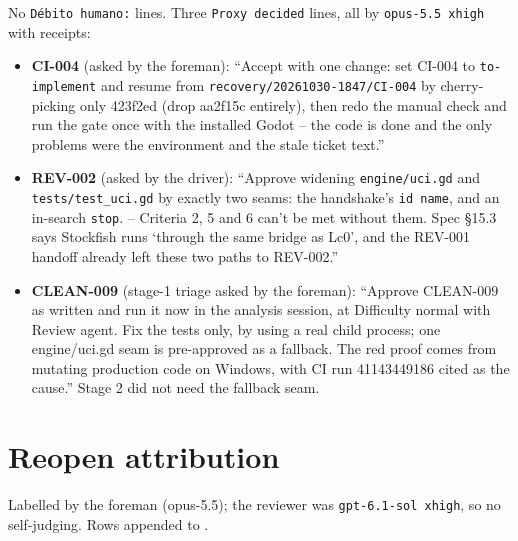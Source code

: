 \documentclass[11pt,a4paper]{article}
\begin{document}
No \texttt{Débito humano:} lines. Three \texttt{Proxy decided} lines, all by
\texttt{opus-5.5 xhigh} with receipts:

\begin{itemize}
  \item \textbf{CI-004} (asked by the foreman): ``Accept with one change: set CI-004 to
        \texttt{to-implement} and resume from \texttt{recovery/20261030-1847/CI-004} by
        cherry-picking only 423f2ed (drop aa2f15c entirely), then redo the manual check and run
        the gate once with the installed Godot -- the code is done and the only problems were the
        environment and the stale ticket text.''
  \item \textbf{REV-002} (asked by the driver): ``Approve widening \texttt{engine/uci.gd} and
        \texttt{tests/test\_uci.gd} by exactly two seams: the handshake's \texttt{id name}, and an
        in-search \texttt{stop}. -- Criteria 2, 5 and 6 can't be met without them. Spec §15.3 says
        Stockfish runs `through the same bridge as Lc0', and the REV-001 handoff already left
        these two paths to REV-002.''
  \item \textbf{CLEAN-009} (stage-1 triage asked by the foreman): ``Approve CLEAN-009 as written
        and run it now in the analysis session, at Difficulty normal with Review agent. Fix the
        tests only, by using a real child process; one engine/uci.gd seam is pre-approved as a
        fallback. The red proof comes from mutating production code on Windows, with CI run
        41143449186 cited as the cause.'' Stage 2 did not need the fallback seam.
\end{itemize}

\section*{Reopen attribution}

Labelled by the foreman (opus-5.5); the reviewer was \texttt{gpt-6.1-sol xhigh}, so no
self-judging. Rows appended to .
\end{document}
